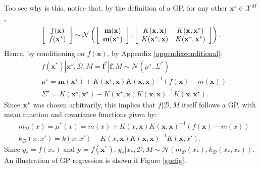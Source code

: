 Too see why is this, notice that, by the definition of a GP, for any other $\mathbf{x}^\star \in \mathcal{X}^M$, 
\begin{equation} \label{jointGP}
\left[ \begin{array}{c} 
f(\mathbf{x}) \\
f(\mathbf{x}^*) \end{array} \right] \sim \mathcal{N} 
\left( \left[ \begin{array}{c}
\mathbf{m}(\mathbf{x}) \\
\mathbf{m}(\mathbf{x}^*) \end{array} \right] , 
\left[ \begin{array}{c c} 
K(\mathbf{x},\mathbf{x}) & K(\mathbf{x},\mathbf{x}^*) \\
K(\mathbf{x}^*,\mathbf{x}) & K(\mathbf{x}^*,\mathbf{x}^*) \end{array} \right]
\right).
\end{equation}
Hence, by conditioning on $f(\mathbf{x})$, by Appendix \ref{appendixconditional}:
\begin{equation}\label{meancovGPRpure}
\begin{split}
& f(\mathbf{x}^*) | \mathbf{x}^\star, \mathcal{D}, M = \mathbf{f}^*|\mathbf{f},M \sim \mathcal{N}(\mu^\star,\Sigma^*) \\
& \mu^\star = \mathbf{m}(\mathbf{x}^\star) + K(\mathbf{x}^\star,\mathbf{x}) K(\mathbf{x},\mathbf{x})^{-1} (f(\mathbf{x}) - m(\mathbf{x})) \\
& \Sigma^\star = K(\mathbf{x}^\star,\mathbf{x}^\star) - K(\mathbf{x}^\star,\mathbf{x}) K(\mathbf{x},\mathbf{x})^{-1} K(\mathbf{x},\mathbf{x}^\star).
\end{split}
\end{equation}
Since ${\mathbf x}^*$ was chosen arbitrarily, this implies that $f|\mathcal{D},M$ itself follows a GP, with mean function and covariance functions given by:
\begin{equation}\label{GPRasGP}
\begin{split}
& m_{\mathcal{D}}(x) = \mu^*(x) = m(x) + K(x,\mathbf{x}) K(\mathbf{x},\mathbf{x})^{-1} (f(\mathbf{x}) - m(x)) \\
& k_{\mathcal{D}}(x,x') = k(x,x') - K(x,\mathbf{x}) K(\mathbf{x},\mathbf{x})^{-1} K(\mathbf{x},x').
\end{split}
\end{equation}
Since $y_* = f(x_*)$ and $\mathbf{y} = f(\mathbf{x}^*)$, $y_*|x_*,\mathcal{D},M \sim \mathcal{N}(m_\mathcal{D}(x_*),k_\mathcal{D}(x_*,x_*))$. An illustration of GP regression is shown if Figure \ref{gprfig}.


